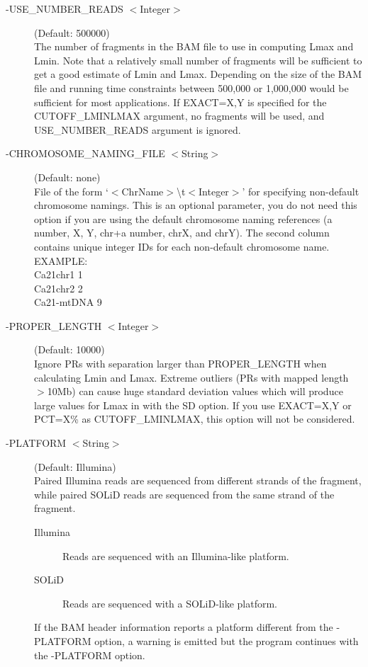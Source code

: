 \documentclass[11pt]{article}
\begin{document}
\begin{description}
\item[-USE\_NUMBER\_READS $<$Integer$>$] (Default: 500000)\\
The number of fragments in the BAM file to use in computing Lmax and Lmin. Note that a relatively small number of fragments will be sufficient to get a good estimate of Lmin and Lmax.
Depending on the size of the BAM file and running time
constraints between 500,000 or 1,000,000 would be
sufficient for most applications. If EXACT=X,Y is 
specified for the CUTOFF\_LMINLMAX argument, no fragments
will be used, and USE\_NUMBER\_READS argument is ignored. 

\item[-CHROMOSOME\_NAMING\_FILE $<$String$>$] (Default: none)\\
File of the form `$<$ChrName$>$\textbackslash t$<$Integer$>$' for specifying non-default chromosome namings.  This is an optional parameter, you do not need this option if you are using the default chromosome naming references (a number, X, Y, chr+a number, chrX, and chrY).  The second column contains unique integer IDs for each non-default chromosome name.\\
\noindent EXAMPLE: \\
\noindent Ca21chr1        1 \\ 
\noindent Ca21chr2        2 \\
\noindent Ca21-mtDNA      9 

\item[-PROPER\_LENGTH $<$Integer$>$] (Default: 10000)\\
Ignore PRs with separation larger than PROPER\_LENGTH when calculating Lmin and Lmax. Extreme outliers (PRs with mapped length $>$10Mb) can cause huge standard deviation values which will produce large values for Lmax in with the SD option. 
If you use EXACT=X,Y or PCT=X\% as CUTOFF\_LMINLMAX, this option will not be considered.

\item[-PLATFORM $<$String$>$] (Default: Illumina)\\
Paired Illumina reads are sequenced from different strands of the fragment, while paired SOLiD reads are sequenced from the same strand of the fragment.  
\begin{description}
\item[Illumina] Reads are sequenced with an Illumina-like platform.
\item[SOLiD] Reads are sequenced with a SOLiD-like platform. 
\end{description}
If the BAM header information reports a platform different from the -PLATFORM option, a warning is emitted but the program continues with the -PLATFORM option.


\end{description}
\end{document}
